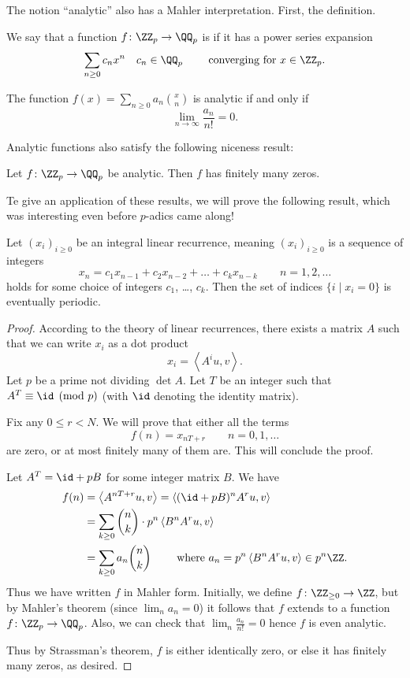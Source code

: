 The notion ``analytic'' also has a Mahler interpretation.
First, the definition.
\begin{definition}
We say that a function $f \colon \ZZ_p \to \QQ_p$ is 
if it has a power series expansion
\[ \sum_{n \ge 0} c_n x^n \quad c_n \in \QQ_p
	\qquad\text{ converging for } x \in \ZZ_p. \]
\end{definition}
\begin{theorem}
	The function $f(x) = \sum_{n \ge 0} a_n \binom xn$ is analytic
	if and only if
	\[ \lim_{n \to \infty} \frac{a_n}{n!} = 0. \]
\end{theorem}
Analytic functions also satisfy the following niceness result:
\begin{theorem}
	Let $f \colon \ZZ_p \to \QQ_p$ be analytic.
	Then $f$ has finitely many zeros.
\end{theorem}

Te give an application of these results,
we will prove the following result,
which was interesting even before $p$-adics came along!
\begin{theorem}
	Let $(x_i)_{i \ge 0}$ be an integral linear recurrence,
	meaning $(x_i)_{i \ge 0}$ is a sequence of integers
	\[ x_n = c_1 x_{n-1} + c_2 x_{n-2} + \dots + c_k x_{n-k}
		\qquad n = 1, 2, \dots \]
	holds for some choice of integers $c_1$, \dots, $c_k$.
	Then the set of indices $\{ i \mid x_i = 0 \}$
	is eventually periodic.
\end{theorem}

\begin{proof}
	According to the theory of linear recurrences,
	there exists a matrix $A$ such that we can write
	$x_i$ as a dot product
	\[ x_i = \left< A^i u, v \right>. \]
	Let $p$ be a prime not dividing $\det A$.
	Let $T$ be an integer such that $A^T \equiv \id \pmod p$
	(with $\id$ denoting the identity matrix).

	Fix any $0 \le r < N$.
	We will prove that either all the terms
	\[ f(n) = x_{nT+r} \qquad n = 0, 1, \dots \]
	are zero, or at most finitely many of them are.
	This will conclude the proof.

	Let $A^T = \id + pB$ for some integer matrix $B$.
	We have
	\begin{align*}
		f(n) &= \left< A^{nT+r} u, v \right>
		= \left< (\id + pB)^n A^r u, v \right> \\
		&= \sum_{k \ge 0} \binom nk \cdot p^n \left< B^n A^r u, v \right> \\
		&= \sum_{k \ge 0} a_n \binom nk \qquad \text{ where }
			a_n = p^n \left< B^n A^r u, v \right> \in p^n \ZZ.
	\end{align*}
	Thus we have written $f$ in Mahler form.
	Initially, we define $f \colon \ZZ_{\ge 0} \to \ZZ$,
	but by Mahler's theorem (since $\lim_n a_n = 0$)
	it follows that $f$ extends to a function $f \colon \ZZ_p \to \QQ_p$.
	Also, we can check that $\lim_n \frac{a_n}{n!} = 0$
	hence $f$ is even analytic.

	Thus by Strassman's theorem, $f$ is either identically zero,
	or else it has finitely many zeros, as desired.
\end{proof}



